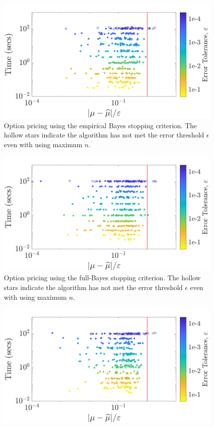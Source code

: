 \documentclass[graybox,footinfo]{svmult}
\begin{document}
{{{{{{\begin{figure}
\centering
\includegraphics[width=0.95\linewidth]{"figures/Sobol/Sobol_optPrice_guaranteed_time_MLE__d12_r1_2019-Sep-1"}
\caption[Sobol: Option pricing guaranteed: MLE]{Option pricing using the empirical Bayes stopping criterion. The hollow stars indicate the algorithm has not met the error threshold $\epsilon$ even with using maximum $n$.}
\label{fig:Sobol-optprice-guaranteed-MLE}
\end{figure}
\begin{figure}
\centering
\includegraphics[width=0.95\linewidth]{"figures/Sobol/Sobol_optPrice_guaranteed_time_full__d12_r1_2019-Sep-1"}
\caption[Sobol: Option pricing guaranteed: Full Bayes]{Option pricing using the full-Bayes stopping criterion. The hollow stars indicate the algorithm has not met the error threshold $\epsilon$ even with using maximum $n$.}
\label{fig:Sobol-optprice-guaranteed-FB}
\end{figure}
\begin{figure}
\centering
\includegraphics[width=0.95\linewidth]{"figures/Sobol/Sobol_optPrice_guaranteed_time_GCV__d12_r1_2019-Sep-1"}

\end{figure}}}}}}}
\end{document}
